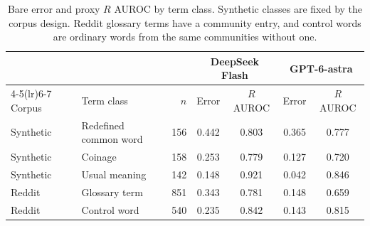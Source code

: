 \begin{table}[h]\centering\footnotesize
\caption{Bare error and proxy $R$ AUROC by term class. Synthetic classes are fixed by the corpus design. Reddit glossary terms have a community entry, and control words are ordinary words from the same communities without one.}
\label{tab:classes}
\begin{tabular}{@{}llrcccc@{}}\toprule
 & & & \multicolumn{2}{c}{DeepSeek Flash} & \multicolumn{2}{c}{GPT-6-astra}\\\cmidrule(lr){4-5}\cmidrule(lr){6-7}
Corpus & Term class & $n$ & Error & $R$ AUROC & Error & $R$ AUROC\\\midrule
Synthetic & Redefined common word & 156 & 0.442 & 0.803 & 0.365 & 0.777\\
Synthetic & Coinage & 158 & 0.253 & 0.779 & 0.127 & 0.720\\
Synthetic & Usual meaning & 142 & 0.148 & 0.921 & 0.042 & 0.846\\
Reddit & Glossary term & 851 & 0.343 & 0.781 & 0.148 & 0.659\\
Reddit & Control word & 540 & 0.235 & 0.842 & 0.143 & 0.815\\\bottomrule
\end{tabular}\end{table}
